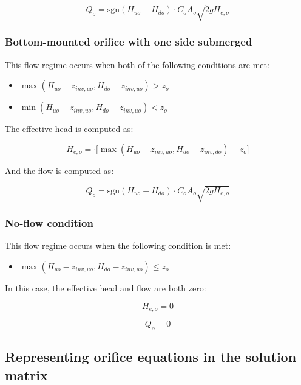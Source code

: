 \documentclass[11pt]{article}
\begin{document}
\begin{equation}
 Q_o = \text{sgn}(H_{uo} - H_{do}) \cdot C_o A_o \sqrt{2 g H_{e,o}} 
\end{equation}

\subsubsection*{Bottom-mounted orifice with one side submerged}

This flow regime occurs when both of the following conditions are met:

\begin{itemize}
\item $\max(H_{uo} - z_{inv,uo}, H_{do} - z_{inv,uo}) > z_o$
\item $\min(H_{uo} - z_{inv,uo}, H_{do} - z_{inv,uo}) < z_o$
\end{itemize}

The effective head is computed as:

\begin{equation}
  H_{e,o} = \cdot \bigl[ \max(H_{uo} - z_{inv,uo}, H_{do} - z_{inv,do}) - z_o \bigr]
\end{equation}

And the flow is computed as:

\begin{equation}
 Q_o = \text{sgn}(H_{uo} - H_{do}) \cdot C_o A_o \sqrt{2 g H_{e,o}} 
\end{equation}

\subsubsection*{No-flow condition}

This flow regime occurs when the following condition is met:

\begin{itemize}
\item $\max(H_{uo} - z_{inv,uo}, H_{do} - z_{inv,uo}) \leq z_o$
\end{itemize}

In this case, the effective head and flow are both zero:

\begin{equation}
  H_{e,o} = 0
\end{equation}

\begin{equation}
  Q_{o} = 0
\end{equation}

\subsection{Representing orifice equations in the solution matrix}
\end{document}
